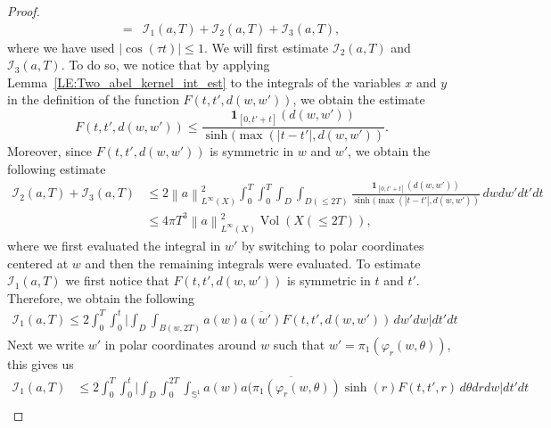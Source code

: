 \documentclass[11pt,twoside,reqno]{amsart}
\newcommand{\1}{\mathrm{\mathbf{1}}}
\DeclareMathOperator{\vol}{Vol}
\newcommand{\norm}[1]{\left\lVert#1\right\rVert}
\numberwithin{equation}{section}
\theoremstyle{plain}
\theoremstyle{definition}
\theoremstyle{remark}
\begin{document}
\begin{proof}
\begin{equation}
\begin{aligned}
         ={}& \mathcal{I}_1(a,T) +\mathcal{I}_2(a,T)+\mathcal{I}_3(a,T),
    \end{aligned}
\end{equation}
where we have used $|\cos(\tau t)|\leq 1$. We will first estimate $\mathcal{I}_2(a,T)$ and $\mathcal{I}_3(a,T)$. To do so, we notice that by applying Lemma~\ref{LE:Two_abel_kernel_int_est} to the integrals of the variables $x$ and $y$ in the definition of the function $ F(t,t',d(w,w'))$, we obtain the estimate 
\begin{equation}\label{EQ:free_HS_est_exponential_mixing_4}
    F(t,t',d(w,w')) \leq  \frac{\boldsymbol{1}_{[0,t'+t]}(d(w,w'))}{\sinh(\max(|t-t'|,d(w,w'))}.
\end{equation}
Moreover, since $ F(t,t',d(w,w'))$ is symmetric in $w$ and $w'$, we obtain the following estimate
\begin{equation}\label{EQ:free_HS_est_exponential_mixing_5}
    \begin{aligned}
        \mathcal{I}_2(a,T)+\mathcal{I}_3(a,T)
        &\leq 
         2\norm{a}^2_{L^\infty(X)}\int_0^T\int_0^T \int_{D} \int_{D( \leq 2T)} \frac{\boldsymbol{1}_{[0,t'+t]}(d(w,w'))}{\sinh(\max(|t-t'|,d(w,w'))}   \, d w  d w'   d t'd t 
         \\
         &\leq 4\pi T^3\norm{a}^2_{L^\infty(X)} \vol(X(\leq 2T)),
    \end{aligned}
\end{equation}
where we first evaluated the integral in $w'$ by switching to polar coordinates centered at $w$ and then the remaining integrals were evaluated. 
To estimate $\mathcal{I}_1(a,T)$ we first notice that $F(t,t',d(w,w'))$ is symmetric in $t$ and $t'$. Therefore, we obtain the following
\begin{equation*}
    \begin{aligned}
        \mathcal{I}_1(a,T)
        \leq 2  \int_0^T\int_0^t \Big| \int_{D}  \int_{B(w,2T) } a(w) \overline{a(w')}  F(t,t',d(w,w'))  \,d w' d w   \Big|   d t'd t
    \end{aligned}
\end{equation*}
Next we write $w'$ in polar coordinates around $w$ such that $w' = \pi_1(\varphi_r(w,\theta))$, this gives us 
\begin{equation*}
    \begin{aligned}
        \mathcal{I}_1(a,T)
        &\leq 2  \int_0^T\int_0^t \Big| \int_{D} \int_{0}^{2T}  \int_{\mathbb{S}^1 } a(w) \overline{a(\pi_1(\varphi_r(w,\theta))}  \sinh(r) F(t,t',r)  \,d \theta d r d w   \Big|   d t'd t
        \\

\end{aligned}
\end{equation*}
\end{proof}
\end{document}
